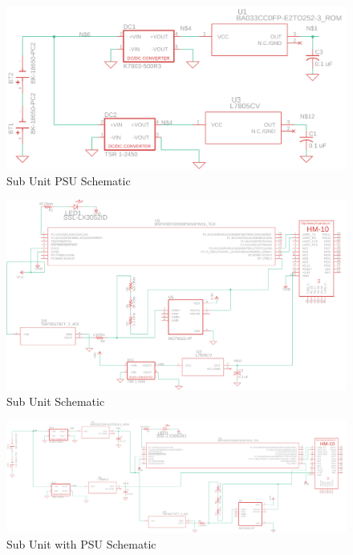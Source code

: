 \documentclass[12pt]{article}
\begin{document}
\begin{landscape}
  \begin{center}
  \begin{figure}[H]
    \includegraphics[width=1.6\textwidth, left]{../Modular Design/Sub-Unit-PSU/Figures/sub-unit-psu.png}
    \caption{Sub Unit PSU Schematic}
    \label{fig:sub-psu-schematic}
  \end{figure}
  \end{center}
  \begin{center}
  \begin{figure}[H]
    \includegraphics[width=1.6\textwidth, left]{../Appendix/Figures/sub-unit.png}
    \caption{Sub Unit Schematic}
    \label{fig:sub-schematic}
  \end{figure}
  \end{center}

  \begin{center}
  \begin{figure}[H]
    \includegraphics[width=\pdfpagewidth,height=0.65\textheight]{../Modular Design/Sub-Unit/Figures/sub-unit-and-psu.png}
    \caption{Sub Unit with PSU Schematic}
    \label{fig:sub-with-psu-schematic}
  \end{figure}
  \end{center}
\end{landscape}
\end{document}
